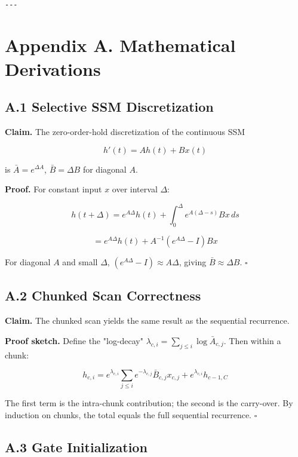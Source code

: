 \begin{lstlisting}

---
\end{lstlisting}


\section{Appendix A. Mathematical Derivations}

\subsection{A.1 Selective SSM Discretization}

\textbf{Claim.} The zero-order-hold discretization of the continuous SSM

\[
h'(t) = A h(t) + B x(t)
\tag{A.1}
\]

is $\bar{A} = e^{\Delta A}$, $\bar{B} = \Delta B$ for diagonal $A$.

\textbf{Proof.} For constant input $x$ over interval $\Delta$:

\[
h(t + \Delta) = e^{A \Delta} h(t) + \int_0^\Delta e^{A(\Delta - s)} B x \, ds
\]

\[
= e^{A \Delta} h(t) + A^{-1}(e^{A \Delta} - I) B x
\]

For diagonal $A$ and small $\Delta$, $(e^{A\Delta} - I) \approx A \Delta$, 
giving $\bar{B} \approx \Delta B$. $\square$

\subsection{A.2 Chunked Scan Correctness}

\textbf{Claim.} The chunked scan yields the same result as the sequential 
recurrence.

\textbf{Proof sketch.} Define the "log-decay" $\lambda_{c, i} = \sum_{j \leq i} \log \bar{A}_{c, j}$. 
Then within a chunk:

\[
h_{c, i} = e^{\lambda_{c, i}} \sum_{j \leq i} e^{-\lambda_{c, j}} \bar{B}_{c, j} x_{c, j} + e^{\lambda_{c, i}} h_{c-1, C}
\]

The first term is the intra-chunk contribution; the second is the carry-over. 
By induction on chunks, the total equals the full sequential recurrence. $\square$

\subsection{A.3 Gate Initialization}

